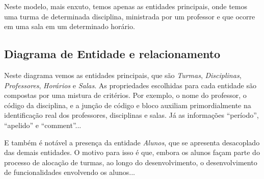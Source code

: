 Neste modelo, mais enxuto, temos apenas as entidades principais, onde temos uma turma de determinada disciplina, ministrada por um professor e que ocorre em uma sala em um determinado horário.

\subsection{Diagrama de Entidade e relacionamento} %



Neste diagrama vemos as entidades principais, que são \textit{Turmas}, \textit{Disciplinas}, \textit{Professores}, \textit{Horários} e \textit{Salas}. As propriedades escolhidas para cada entidade são compostas por uma mistura de critérios. Por exemplo, o nome do professor, o código da disciplina, e a junção de código e bloco auxiliam primordialmente na identificação real dos professores, disciplinas e salas. Já as informações ``período'', ``apelido'' e ``comment''...

E também é notável a presença da entidade \textit{Alunos}, que se apresenta desacoplado das demais entidades. O motivo para isso é que, embora os alunos façam parte do processo de alocação de turmas, ao longo do desenvolvimento, o desenvolvimento de funcionalidades envolvendo os alunos...
